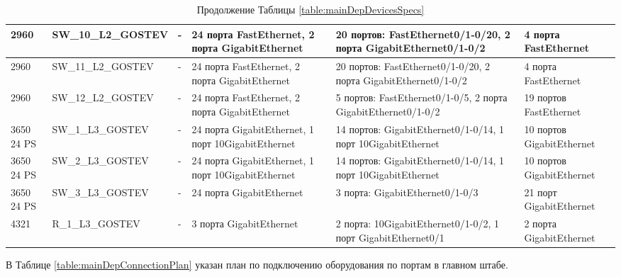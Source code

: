 \documentclass[14pt, a4paper]{extarticle}
\numberwithin{equation}{section}
\begin{document}
\begin{landscape}
\begin{table}[H]
\centering
\small
\caption*{Продолжение Таблицы \ref{table:mainDepDevicesSpecs}}
\begin{tabular}{|m{2.5cm}|m{4cm}|m{2.5cm}|m{4.2cm}|m{5.3cm}|m{4cm}|}
\hline
2960 &
SW\_10\_L2\_GOSTEV &
- &
24 порта FastEthernet, 2 порта GigabitEthernet &
20 портов: FastEthernet0/1-0/20, 2 порта GigabitEthernet0/1-0/2 &
4 порта FastEthernet \\
\hline
2960 &
SW\_11\_L2\_GOSTEV &
- &
24 порта FastEthernet, 2 порта GigabitEthernet &
20 портов: FastEthernet0/1-0/20, 2 порта GigabitEthernet0/1-0/2 &
4 порта FastEthernet \\
\hline
2960 &
SW\_12\_L2\_GOSTEV &
- &
24 порта FastEthernet, 2 порта GigabitEthernet &
5 портов: FastEthernet0/1-0/5, 2 порта GigabitEthernet0/1-0/2 &
19 портов FastEthernet \\
\hline
3650 24 PS &
SW\_1\_L3\_GOSTEV &
- &
24 порта GigabitEthernet, 1 порт 10GigabitEthernet &
14 портов: GigabitEthernet0/1-0/14, 1 порт 10GigabitEthernet &
10 портов GigabitEthernet \\
\hline
3650 24 PS &
SW\_2\_L3\_GOSTEV &
- &
24 порта GigabitEthernet, 1 порт 10GigabitEthernet &
14 портов: GigabitEthernet0/1-0/14, 1 порт 10GigabitEthernet &
10 портов GigabitEthernet \\
\hline
3650 24 PS &
SW\_3\_L3\_GOSTEV &
- &
24 порта GigabitEthernet&
3 порта: GigabitEthernet0/1-0/3 &
21 порт GigabitEthernet \\
\hline
4321 &
R\_1\_L3\_GOSTEV &
- &
3 порта GigabitEthernet &
2 порта: 10GigabitEthernet0/1-0/2, 1 порт GigabitEthernet0/1 &
2 порта GigabitEthernet\\
\hline
\end{tabular}
\end{table}
\end{landscape}

В Таблице \ref{table:mainDepConnectionPlan} указан план по подключению оборудования по портам в главном штабе.
\end{document}
